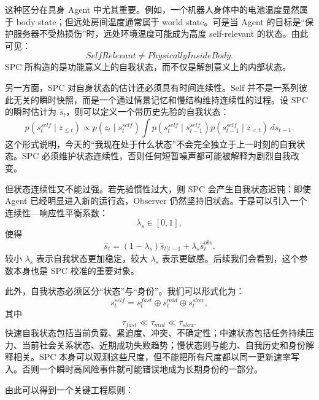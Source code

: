 这种区分在具身 Agent 中尤其重要。例如，一个机器人身体中的电池温度显然属于 body state；但远处房间温度通常属于 world state。可是当 Agent 的目标是“保护服务器不受热损伤”时，远处环境温度可能成为高度 self-relevant 的状态。由此可见：
\begin{equation}
SelfRelevant
\neq
PhysicallyInsideBody.
\end{equation}
SPC 所构造的是功能意义上的自我状态，而不仅是解剖意义上的内部状态。

另一方面，SPC 对自身状态的估计还必须具有时间连续性。Self 并不是一系列彼此无关的瞬时快照，而是一个通过情景记忆和慢结构维持连续性的过程。设 SPC 的瞬时估计为 $\hat s_t$，则可以定义一个带历史先验的自我状态：
\begin{equation}
p(s_t^{self}\mid z_{\leq t})
\propto
p(z_t\mid s_t^{self})
\int
p(s_t^{self}\mid s_{t-1}^{self})
p(s_{t-1}^{self}\mid z_{<t})
\,ds_{t-1}.
\end{equation}
这个形式说明，今天的“我现在处于什么状态”不会完全独立于上一时刻的自我状态。SPC 必须维护状态连续性，否则任何短暂噪声都可能被解释为剧烈自我改变。

但状态连续性又不能过强。若先验惯性过大，则 SPC 会产生自我状态迟钝：即使 Agent 已经明显进入新的运行态，Observer 仍然坚持旧状态。于是可以引入一个连续性—响应性平衡系数：
\begin{equation}
\lambda_s
\in[0,1],
\end{equation}
使得
\begin{equation}
\hat s_t
=
(1-\lambda_s)
\hat s_{t|t-1}
+
\lambda_s
\hat s_t^{obs}.
\end{equation}
较小 $\lambda_s$ 表示自我状态更加稳定，较大 $\lambda_s$ 表示更敏感。后续我们会看到，这个参数本身也是 SPC 校准的重要对象。

此外，自我状态必须区分“状态”与“身份”。我们可以形式化为：
\begin{equation}
s_t^{self}
=
s_t^{fast}
\oplus
s_t^{mid}
\oplus
s_t^{slow},
\end{equation}
其中
\begin{equation}
\tau_{fast}
\ll
\tau_{mid}
\ll
\tau_{slow}.
\end{equation}
快速自我状态包括当前负载、紧迫度、冲突、不确定性；中速状态包括任务持续压力、当前社会关系状态、近期成功失败趋势；慢状态则与能力、自我历史和身份解释相关。SPC 本身可以观测这些尺度，但不能把所有尺度都以同一更新速率写入。否则一个瞬时高风险事件就可能错误地成为长期身份的一部分。

由此可以得到一个关键工程原则：
\begin{statementbox}
\centering
{}
\end{statementbox}

